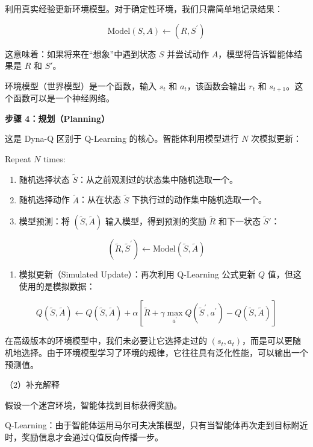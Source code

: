 利用真实经验更新环境模型。对于确定性环境，我们只需简单地记录结果：

\[
\mathrm{Model}(S,A)\leftarrow(R,S^{\prime})
\]

这意味着：如果将来在``想象''中遇到状态 \(S\) 并尝试动作 \(A\)，模型将告诉智能体结果是 \(R\) 和 \(S'\)。

环境模型（世界模型）是一个函数，输入 \(s_t\) 和 \(a_t\)，该函数会输出 \(r_t\) 和 \(s_{t+1}\)。这个函数可以是一个神经网络。

\textbf{步骤 4：规划（Planning）}

这是 Dyna-Q 区别于 Q-Learning 的核心。智能体利用模型进行 \(N\) 次模拟更新：

Repeat \(N\) times:

\begin{enumerate}
\def\labelenumi{\arabic{enumi}.}
\tightlist
\item
  随机选择状态 \(\tilde{S}\)：从之前观测过的状态集中随机选取一个。
\item
  随机选择动作 \(\tilde{A}\)：从在状态 \(\tilde{S}\) 下执行过的动作集中随机选取一个。
\item
{}
  模型预测：将 \((\tilde{S},\tilde{A})\) 输入模型，得到预测的奖励 \(\tilde{R}\) 和下一状态 \(\tilde{S}'\)：
\end{enumerate}

\[
(\tilde{R},\tilde{S}^{\prime})\leftarrow \mathrm{Model}(\tilde{S},\tilde{A})
\]

\begin{enumerate}
\def\labelenumi{\arabic{enumi}.}
\setcounter{enumi}{3}
\tightlist
\item
{}
  模拟更新（Simulated Update）：再次利用 Q-Learning 公式更新 \(Q\) 值，但这使用的是模拟数据：
\end{enumerate}

\[
Q(\tilde{S},\tilde{A})\leftarrow Q(\tilde{S},\tilde{A})+\alpha[\tilde{R}+\gamma\max_{a^{\prime}}Q(\tilde{S}^{\prime},a^{\prime})-Q(\tilde{S},\tilde{A})]
\]

在高级版本的环境模型中，我们未必要让它选择走过的 \((s_t,a_t)\)，而是可以更随机地选择。由于环境模型学习了环境的规律，它往往具有泛化性能，可以输出一个预测值。

（2）补充解释

假设一个迷宫环境，智能体找到目标获得奖励。

Q-Learning：由于智能体运用马尔可夫决策模型，只有当智能体再次走到目标附近时，奖励信息才会通过Q值反向传播一步。

